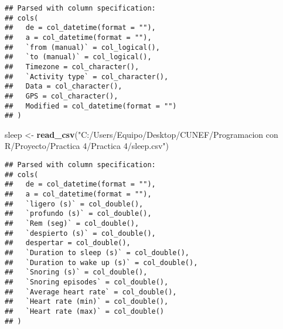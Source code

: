 \documentclass[]{article}
\newenvironment{Shaded}{\begin{snugshade}}{\end{snugshade}}
\newcommand{\KeywordTok}[1]{\textcolor[rgb]{0.13,0.29,0.53}{\textbf{#1}}}
\newcommand{\NormalTok}[1]{#1}
\newcommand{\StringTok}[1]{\textcolor[rgb]{0.31,0.60,0.02}{#1}}
\begin{document}
\begin{verbatim}
## Parsed with column specification:
## cols(
##   de = col_datetime(format = ""),
##   a = col_datetime(format = ""),
##   `from (manual)` = col_logical(),
##   `to (manual)` = col_logical(),
##   Timezone = col_character(),
##   `Activity type` = col_character(),
##   Data = col_character(),
##   GPS = col_character(),
##   Modified = col_datetime(format = "")
## )
\end{verbatim}

\begin{Shaded}
\begin{Highlighting}[]
\NormalTok{sleep <-}\StringTok{ }\KeywordTok{read_csv}\NormalTok{(}\StringTok{"C:/Users/Equipo/Desktop/CUNEF/Programacion con R/Proyecto/Practica 4/Practica 4/sleep.csv"}\NormalTok{)}
\end{Highlighting}
\end{Shaded}

\begin{verbatim}
## Parsed with column specification:
## cols(
##   de = col_datetime(format = ""),
##   a = col_datetime(format = ""),
##   `ligero (s)` = col_double(),
##   `profundo (s)` = col_double(),
##   `Rem (seg)` = col_double(),
##   `despierto (s)` = col_double(),
##   despertar = col_double(),
##   `Duration to sleep (s)` = col_double(),
##   `Duration to wake up (s)` = col_double(),
##   `Snoring (s)` = col_double(),
##   `Snoring episodes` = col_double(),
##   `Average heart rate` = col_double(),
##   `Heart rate (min)` = col_double(),
##   `Heart rate (max)` = col_double()
## )
\end{verbatim}
\end{document}
